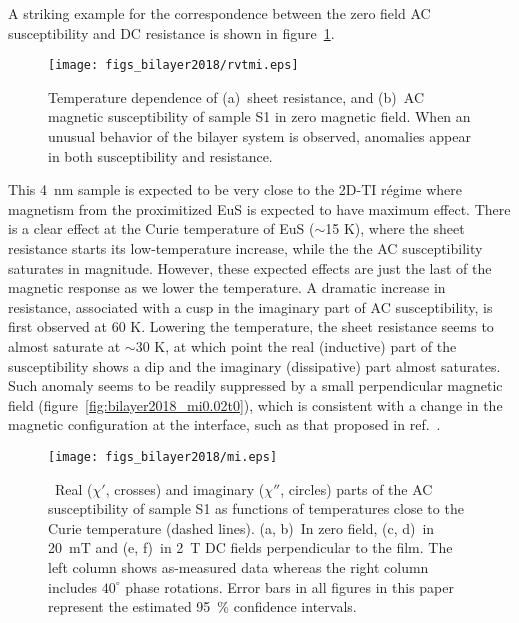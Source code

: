 A striking example for the correspondence between the zero field AC susceptibility and DC resistance is shown in figure~\ref{fig:bilayer2018_mirvt}. %
 \begin{figure}[ht]%
	\centering%
    \subfloat{\label{fig:bilayer2018_s1rvt}}%
    \subfloat{\label{fig:bilayer2018_s1mi}}%
    \texttt{[image: figs\_bilayer2018/rvtmi.eps]}%
    \caption[Coincidental anomalies in the temperature dependence of resistance and of AC magnetic susceptibility of the (Bi$_{x}$Sb$_{1-x}$)$_2$Te$_3$--EuS bilayer sample S1]{\label{fig:bilayer2018_mirvt}Temperature dependence of (a)~sheet resistance, and (b)~AC magnetic susceptibility of sample S1 in zero magnetic field. When an unusual behavior of the bilayer system is observed, anomalies appear in both susceptibility and resistance.}%
\end{figure}%
This 4~nm sample is expected to be very close to the 2D-TI r\'egime where magnetism from the proximitized EuS is expected to have maximum effect. There is a clear effect at the Curie temperature of EuS ($\sim$15 K), where the sheet resistance starts its low-temperature increase, while the the AC susceptibility saturates in magnitude. However, these expected effects are just the last of the magnetic response as we lower the temperature. A dramatic increase in resistance, associated with a cusp in the imaginary part of AC susceptibility, is first observed at 60 K. Lowering the temperature, the sheet resistance seems to almost saturate at $\sim$30 K, at which point the real (inductive) part of the susceptibility shows a dip and the imaginary (dissipative) part almost saturates. Such anomaly seems to be readily suppressed by a small perpendicular magnetic field (figure~\ref{fig:bilayer2018_mi0.02t0}), which is consistent with a change in the magnetic configuration at the interface, such as that proposed in ref.~\cite{Moodera2016}. %
\begin{figure}[ht]%
    \centering%
    \subfloat{\label{fig:bilayer2018_mi0t0}}%
    \subfloat{\label{fig:bilayer2018_mi0t40}}%
    \subfloat{\label{fig:bilayer2018_mi0.02t0}}%
    \subfloat{\label{fig:bilayer2018_mi0.02t40}}%
    \subfloat{\label{fig:bilayer2018_mi2t0}}%
    \subfloat{\label{fig:bilayer2018_mi2t40}}%
    \texttt{[image: figs\_bilayer2018/mi.eps]}%
    \caption[AC magnetic susceptibility of sample S1 in external DC fields.]{\label{fig:bilayer2018_mi}~Real ($\chi'$, crosses) and imaginary ($\chi''$, circles) parts of the AC susceptibility of sample S1 as functions of temperatures close to the Curie temperature (dashed lines). (a, b)~In zero field, (c, d)~in 20~mT and (e, f)~in 2~T DC fields perpendicular to the film. The left column shows as-measured data whereas the right column includes $40^{\circ}$ phase rotations. Error bars in all figures in this paper represent the estimated 95~\protect\% confidence intervals.}%
\end{figure}%
